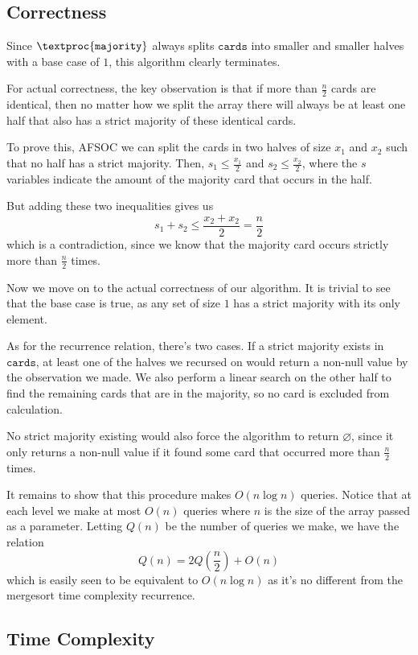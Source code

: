 \documentclass[12pt]{article}
\begin{document}
\subsection{Correctness}

Since $\textproc{\texttt{majority}}$ always splits $\texttt{cards}$
into smaller and smaller halves with a base case of $1$,
this algorithm clearly terminates.

For actual correctness,
the key observation is that if more than $\frac{n}{2}$ cards are identical,
then no matter how we split the array there will always be at least one
half that also has a strict majority of these identical cards.

To prove this, AFSOC we can split the cards in two halves of size $x_1$ and $x_2$
such that no half has a strict majority.
Then, $s_1 \le \frac{x_1}{2}$ and $s_2 \le \frac{x_2}{2}$,
where the $s$ variables indicate the amount of the majority card
that occurs in the half.

But adding these two inequalities gives us
\[s_1+s_2 \le \frac{x_2+x_2}{2} = \frac{n}{2}\]
which is a contradiction, since we know that the majority
card occurs strictly more than $\frac{n}{2}$ times.

Now we move on to the actual correctness of our algorithm.
It is trivial to see that the base case is true,
as any set of size $1$ has a strict majority with its only element.

As for the recurrence relation, there's two cases.
If a strict majority exists in $\texttt{cards}$,
at least one of the halves we recursed on would return a non-null value
by the observation we made.
We also perform a linear search on the other half to find the remaining
cards that are in the majority, so no card is excluded from calculation.

No strict majority existing would also force the algorithm to return $\varnothing$,
since it only returns a non-null value if it found some card
that occurred more than $\frac{n}{2}$ times.

It remains to show that this procedure makes $O(n \log n)$ queries.
Notice that at each level we make at most $O(n)$ queries
where $n$ is the size of the array passed as a parameter.
Letting $Q(n)$ be the number of queries we make, we have the relation
\[Q(n)=2Q\left(\frac{n}{2}\right)+O(n)\]
which is easily seen to be equivalent to $O(n \log n)$
as it's no different from the mergesort time complexity recurrence.

\subsection{Time Complexity}
\end{document}
